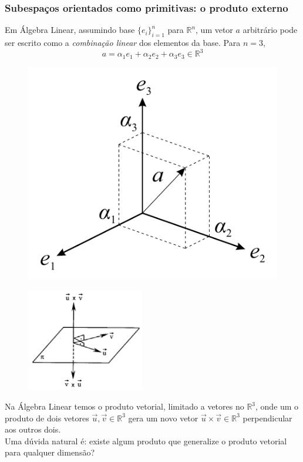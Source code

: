 \documentclass[10pt]{beamer}
\theoremstyle{plain}
\theoremstyle{definition}
\begin{document}
	\begin{frame}
		\frametitle{Subespaços orientados como primitivas: o produto externo}
		
		Em Álgebra Linear, assumindo base $\{e_i\}^n_{i=1}$ para $\mathbb{R}^n$, um vetor $a$ arbitrário pode ser escrito como a \textit{combinação linear} dos elementos da base. Para $n=3$, $$a = \alpha_1e_1 + \alpha_2e_2 + \alpha_3e_3\in \mathbb{R}^3$$
		
		\begin{figure}[H]
			\hspace{-5cm}
			\includegraphics[width=0.4\linewidth]{figures/aR3.png}
		\end{figure}
		
		\vspace{-3.7cm}
		\begin{figure}[H]
			\hspace{5cm}
			\includegraphics[width=0.3\linewidth]{figures/produtoVetorial.png}
		\end{figure}
		
		
		Na Álgebra Linear temos o produto vetorial, limitado a vetores no $\mathbb{R}^3$, onde um o produto de dois vetores $\vec u,\vec v\in \mathbb{R}^3$ gera um novo vetor $\vec u \times \vec v\in \mathbb{R}^3$ perpendicular aos outros dois.\\
		Uma dúvida natural é: existe algum produto que generalize o produto vetorial para qualquer dimensão?
		
	\end{frame}
\end{document}
